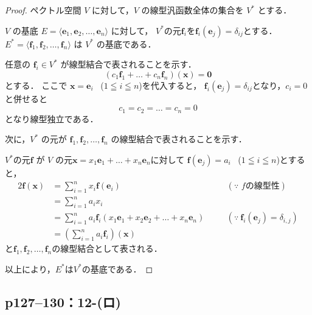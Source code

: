 \documentclass[a4paper,10pt,fleqn]{ltjsarticle}
\begin{document}
\begin{tleftbar}
  \begin{proof}
    ペクトル空間 $V$ に対して，$V$ の線型汎函数全体の集合を $V^*$ とする．

    $V$ の基底 $E= \langle \bm{e}_1, \bm{e}_2, \dots, \bm{e}_n\rangle $ に対して，
    $V^*$の元$\bm{f}_i$を$\bm{f}_i(\bm{e}_j)=\delta_{ij}$とする．
    $E^* = \langle \bm{f}_1, \bm{f}_2, \dots, \bm{f}_n\rangle$ は $V^*$ の基底である．

    任意の $\bm{f}_i  \in V^*$ が線型結合で表されることを示す．
    \[
      (c_1 \bm{f}_1 + \dots + c_n \bm{f}_n) (\bm{x}) = \bm{0}
    \]
    とする．
    ここで $\bm{x} = \bm{e}_i$ ~($1 \leqq i \leqq n$)を代入すると，
    $\bm{f}_i (\bm{e}_j) = \delta_{ij}$となり，$c_i =0$と併せると
    \[
      c_1=c_2 = \dots =c_n = 0
    \]
    となり線型独立である．

    次に，$V^\ast$ の元が $\bm{f}_1, \bm{f}_2, \dots, \bm{f}_n$ の線型結合で表されることを示す．

    $V^\ast$の元$\bm{f}$ が $V$ の元$\bm{x}=x_1 \bm{e}_1 + \dots + x_n \bm{e}_n$に対して
    $\bm{f}(\bm{e}_j) = a_i$~ ($1 \leqq i \leqq n$)とすると，
    \begin{alignat*}{2}
      \bm{f} (\bm{x}) & = \sum_{i=1}^{n} x_i \bm{f}(\bm{e}_i)                                            & \quad & (\text{$\because$~$f$の線型性})                           \\
                      & = \sum_{i=1}^{n} a_i x_i                                                         &       &                                                       \\
                      & = \sum_{i=1}^{n} a_i \bm{f}_i (x_1 \bm{e}_1 + x_2 \bm{e}_2 +\dots+ x_n \bm{e}_n) & \quad & (\text{$\because~ \bm{f}_i (\bm{e}_j)=\delta_{i,j}$}) \\
                      & = \left( \sum_{i=1}^{n} a_i \bm{f}_i \right) (\bm{x})                            &       &
    \end{alignat*}
    と$\bm{f}_1 , \bm{f}_2 , \dots ,\bm{f}_n$の線型結合として表される．

    以上により，$E^\ast$は$V^\ast$の基底である．
  \end{proof}
\end{tleftbar}
\newpage

\subsection*{p127--130：12-(ロ)}
\end{document}
